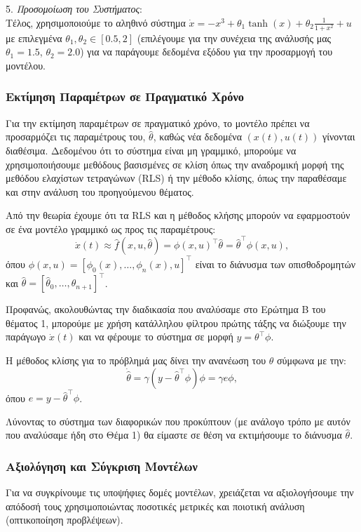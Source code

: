 \documentclass[12pt]{article} %
\numberwithin{equation}{section}  %
\begin{document}
5. \textit{Προσομοίωση του Συστήματος}: \\
Τέλος, χρησιμοποιούμε το αληθινό σύστημα \(\dot{x} = -x^3 + \theta_1 \tanh(x) + \theta_2 \frac{1}{1+x^2} + u\) με επιλεγμένα \(\theta_1, \theta_2 \in [0.5, 2]\) (επιλέγουμε για την συνέχεια της ανάλυσής μας \(\theta_1 = 1.5\), \(\theta_2 = 2.0\)) 
για να παράγουμε δεδομένα εξόδου για την προσαρμογή του μοντέλου. 


\subsubsection{Εκτίμηση Παραμέτρων σε Πραγματικό Χρόνο}

Για την εκτίμηση παραμέτρων σε πραγματικό χρόνο, το μοντέλο πρέπει να προσαρμόζει τις παραμέτρους του, \(\hat{\theta}\), καθώς νέα δεδομένα \((x(t), u(t))\) γίνονται διαθέσιμα. 
Δεδομένου ότι το σύστημα είναι μη γραμμικό, μπορούμε να χρησιμοποιήσουμε μεθόδους βασισμένες σε κλίση όπως την αναδρομική μορφή της μεθόδου ελαχίστων τετραγώνων (RLS) ή την μέθοδο κλίσης, όπως την παραθέσαμε και στην ανάλυση του προηγούμενου θέματος.

Από την θεωρία έχουμε ότι τα RLS και η μέθοδος κλήσης μπορούν να εφαρμοστούν σε ένα μοντέλο γραμμικό ως προς τις παραμέτρους:
\[
\dot{x}(t) \approx \hat{f}(x, u, \hat{\theta}) = \phi(x, u)^{\top} \hat{\theta} = \hat{\theta}^{\top} \phi(x, u),
\]
όπου \(\phi(x, u) = [\phi_0(x), \dots, \phi_n(x), u]^{\top}\) είναι το διάνυσμα των οπισθοδρομητών και \(\hat{\theta} = [\hat{\theta}_0, \dots, \hat{\theta}_{n+1}]^{\top}\). 

Προφανώς, ακολουθώντας την διαδικασία που αναλύσαμε στο Ερώτημα Β του θέματος 1, μπορούμε με χρήση κατάλληλου φίλτρου πρώτης τάξης να διώξουμε την παράγωγο $\dot{x}(t)$ και να φέρουμε το σύστημα σε μορφή $y = \theta^{\top} \phi$.

H μέθοδος κλίσης για το πρόβλημά μας δίνει την ανανέωση του $\theta$ σύμφωνα με την:
\[
\dot{\hat{\theta}} = \gamma (y - \hat\theta^{\top} \phi) \phi = \gamma e \phi,
\]
όπου \(e =  y - \hat\theta^{\top} \phi\).

Λύνοντας το σύστημα των διαφορικών που προκύπτουν (με ανάλογο τρόπο με αυτόν που αναλύσαμε ήδη στο Θέμα 1) θα είμαστε σε θέση να εκτιμήσουμε το διάνυσμα $\hat\theta$.

\subsubsection{Αξιολόγηση και Σύγκριση Μοντέλων}
Για να συγκρίνουμε τις υποψήφιες δομές μοντέλων, χρειάζεται να αξιολογήσουμε την απόδοσή τους χρησιμοποιώντας ποσοτικές μετρικές και ποιοτική ανάλυση (οπτικοποίηση προβλέψεων).
\end{document}
